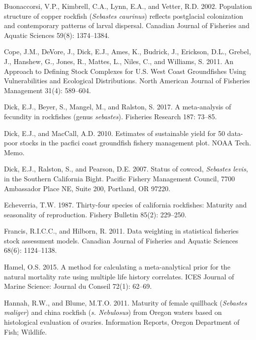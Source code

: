\documentclass[11pt,
  english,
  letterpaper,
]{article}
\begin{document}
\leavevmode\hypertarget{ref-buonaccorsi_population_2002}{}%
Buonaccorsi, V.P., Kimbrell, C.A., Lynn, E.A., and Vetter, R.D. 2002. Population structure of copper rockfish (\emph{Sebastes caurinus}) reflects postglacial colonization and contemporary patterns of larval dispersal. Canadian Journal of Fisheries and Aquatic Sciences 59(8): 1374--1384.

\leavevmode\hypertarget{ref-cope_approach_2011}{}%
Cope, J.M., DeVore, J., Dick, E.J., Ames, K., Budrick, J., Erickson, D.L., Grebel, J., Hanshew, G., Jones, R., Mattes, L., Niles, C., and Williams, S. 2011. An Approach to Defining Stock Complexes for U.S. West Coast Groundfishes Using Vulnerabilities and Ecological Distributions. North American Journal of Fisheries Management 31(4): 589--604.

\leavevmode\hypertarget{ref-dick_meta-analysis_2017}{}%
Dick, E.J., Beyer, S., Mangel, M., and Ralston, S. 2017. A meta-analysis of fecundity in rockfishes (genus \emph{sebastes}). Fisheries Research 187: 73--85.

\leavevmode\hypertarget{ref-DickandMacCall_dbsra_2010}{}%
Dick, E.J., and MacCall, A.D. 2010. Estimates of sustainable yield for 50 data-poor stocks in the pacfici coast groundfish fishery management plot. NOAA Tech. Memo.

\leavevmode\hypertarget{ref-dick_status_2007}{}%
Dick, E.J., Ralston, S., and Pearson, D.E. 2007. Status of cowcod, \emph{Sebastes levis}, in the Southern California Bight. Pacific Fishery Management Council, 7700 Ambassador Place NE, Suite 200, Portland, OR 97220.

\leavevmode\hypertarget{ref-Echeverria_maturity_1987}{}%
Echeverria, T.W. 1987. Thirty-four species of california rockfishes: Maturity and seasonality of reproduction. Fishery Bulletin 85(2): 229--250.

\leavevmode\hypertarget{ref-francis_data_2011}{}%
Francis, R.I.C.C., and Hilborn, R. 2011. Data weighting in statistical fisheries stock assessment models. Canadian Journal of Fisheries and Aquatic Sciences 68(6): 1124--1138.

\leavevmode\hypertarget{ref-hamel_method_2015}{}%
Hamel, O.S. 2015. A method for calculating a meta-analytical prior for the natural mortality rate using multiple life history correlates. ICES Journal of Marine Science: Journal du Conseil 72(1): 62--69.

\leavevmode\hypertarget{ref-HannahandBlume_maturity_2011}{}%
Hannah, R.W., and Blume, M.T.O. 2011. Maturity of female quillback (\emph{Sebastes maliger}) and china rockfish (\emph{s. Nebulosus}) from Oregon waters based on histological evaluation of ovaries. Information Reports, Oregon Department of Fish; Wildlife.
\end{document}
